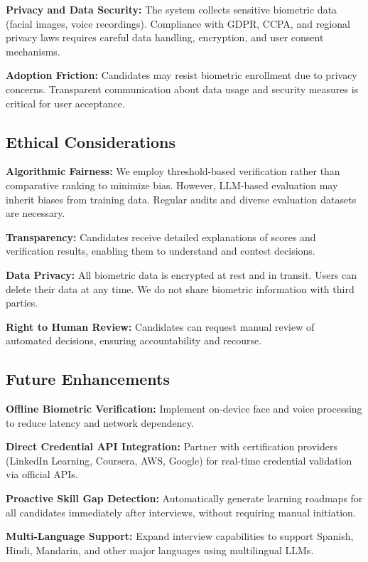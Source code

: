 \documentclass[conference]{IEEEtran}
\begin{document}
\textbf{Privacy and Data Security:} The system collects sensitive biometric data (facial images, voice recordings). Compliance with GDPR, CCPA, and regional privacy laws requires careful data handling, encryption, and user consent mechanisms.

\textbf{Adoption Friction:} Candidates may resist biometric enrollment due to privacy concerns. Transparent communication about data usage and security measures is critical for user acceptance.

\subsection{Ethical Considerations}

\textbf{Algorithmic Fairness:} We employ threshold-based verification rather than comparative ranking to minimize bias. However, LLM-based evaluation may inherit biases from training data. Regular audits and diverse evaluation datasets are necessary.

\textbf{Transparency:} Candidates receive detailed explanations of scores and verification results, enabling them to understand and contest decisions.

\textbf{Data Privacy:} All biometric data is encrypted at rest and in transit. Users can delete their data at any time. We do not share biometric information with third parties.

\textbf{Right to Human Review:} Candidates can request manual review of automated decisions, ensuring accountability and recourse.

\subsection{Future Enhancements}

\textbf{Offline Biometric Verification:} Implement on-device face and voice processing to reduce latency and network dependency.

\textbf{Direct Credential API Integration:} Partner with certification providers (LinkedIn Learning, Coursera, AWS, Google) for real-time credential validation via official APIs.

\textbf{Proactive Skill Gap Detection:} Automatically generate learning roadmaps for all candidates immediately after interviews, without requiring manual initiation.

\textbf{Multi-Language Support:} Expand interview capabilities to support Spanish, Hindi, Mandarin, and other major languages using multilingual LLMs.
\end{document}
